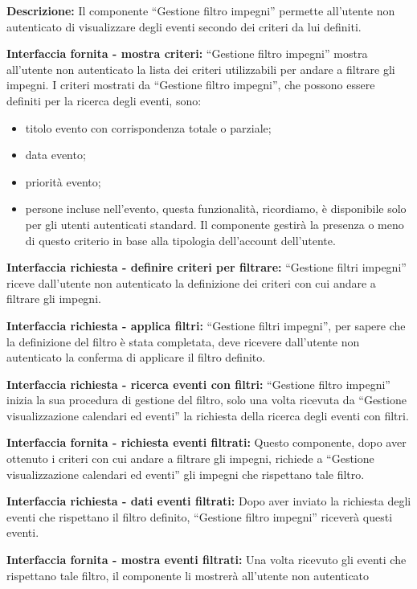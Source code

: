 \begin{listaPersonale}[]{}

    \textbf{Descrizione:} Il componente “Gestione filtro impegni” permette all'utente non autenticato di visualizzare degli eventi secondo dei criteri da lui definiti.

    \textbf{Interfaccia fornita - mostra criteri:} “Gestione filtro impegni” mostra all'utente non autenticato la lista dei criteri utilizzabili per andare a filtrare gli impegni.
    I criteri mostrati da “Gestione filtro impegni”, che possono essere definiti per la ricerca degli eventi, sono:
    \begin{itemize}
        \item titolo evento con corrispondenza totale o parziale;
        \item data evento;
        \item priorità evento;
        \item persone incluse nell'evento, questa funzionalità, ricordiamo, è disponibile solo per gli utenti autenticati standard. Il componente gestirà la presenza o meno di questo criterio in base alla tipologia dell'account dell'utente.
    \end{itemize}

    \textbf{Interfaccia richiesta - definire criteri per filtrare:} “Gestione filtri impegni” riceve dall'utente non autenticato la definizione dei criteri con cui andare a filtrare gli impegni.

    \textbf{Interfaccia richiesta - applica filtri:} “Gestione filtri impegni”, per sapere che la definizione del filtro è stata completata, deve ricevere dall'utente non autenticato la conferma di applicare il filtro definito.

    \textbf{Interfaccia richiesta - ricerca eventi con filtri:} “Gestione filtro impegni” inizia la sua procedura di gestione del filtro, solo una volta ricevuta da “Gestione visualizzazione calendari ed eventi” la richiesta della ricerca degli eventi con filtri.

    \textbf{Interfaccia fornita - richiesta eventi filtrati:} Questo componente, dopo aver ottenuto i criteri con cui andare a filtrare gli impegni, richiede a “Gestione visualizzazione calendari ed eventi” gli impegni che rispettano tale filtro.

    \textbf{Interfaccia richiesta - dati eventi filtrati:} Dopo aver inviato la richiesta degli eventi che rispettano il filtro definito, “Gestione filtro impegni” riceverà questi eventi.

    \textbf{Interfaccia fornita - mostra eventi filtrati:} Una volta ricevuto gli eventi che rispettano tale filtro, il componente li mostrerà all'utente non autenticato


\end{listaPersonale}
